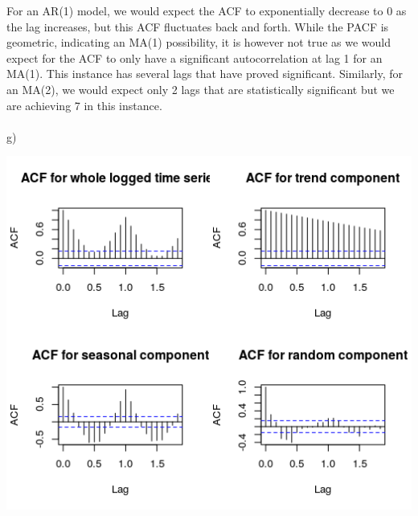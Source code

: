 \documentclass[11pt]{article}
\begin{document}
For an AR(1) model, we would expect the ACF to exponentially decrease to 0 as the lag increases, but this ACF fluctuates back and forth. While the PACF is geometric, indicating an MA(1) possibility, it is however not true as we would expect for the ACF to only have a significant autocorrelation at lag 1 for an MA(1). This instance has several lags that have proved significant. Similarly, for an MA(2), we would expect only 2 lags that are statistically significant but we are achieving 7 in this instance.
\\\\
g)  
\begin{center}
	\includegraphics[scale=1]{plt4g}
\end{center}


\newpage
\end{document}
